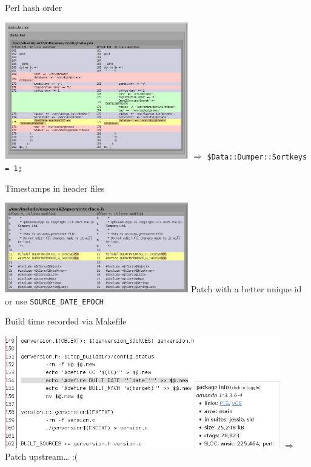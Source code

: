\documentclass[14pt]{beamer}
\begin{document}

\begin{frame}{Perl hash order}
 \begin{center}
  \includegraphics[width=0.6\textwidth]{images/examples/random_perl_hash_order.png}
  \vfill
  $\Longrightarrow$ \texttt{\$Data::Dumper::Sortkeys = 1;}
 \end{center}
\end{frame}

\begin{frame}{Timestamps in header files}
 \begin{center}
  \includegraphics[width=0.6\textwidth]{images/examples/timestamps_in_header_files.png}
  \vfill
  Patch with a better unique id or use \texttt{SOURCE\_DATE\_EPOCH}
 \end{center}
\end{frame}

\begin{frame}{Build time recorded via Makefile}
 \begin{center}
  \includegraphics[width=0.9\textwidth]{images/examples/build_date_in_makefile.png}
  \vfill
  $\Longrightarrow$ Patch upstream\ldots{} :(
 \end{center}
\end{frame}
\end{document}
